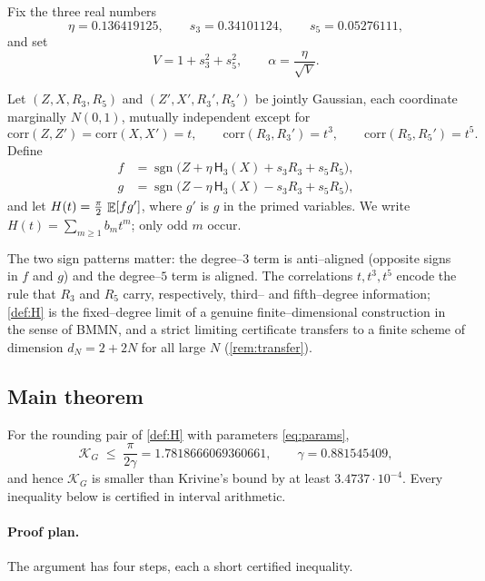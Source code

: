 \documentclass[12pt]{article}
\providecommand{\KG}{\mathcal{K}_G}
\providecommand{\sgn}{\operatorname{sgn}}
\newcommand{\He}{\mathsf{H}}                 %
\newcommand{\gam}{\gamma}
\begin{document}
Fix the three real numbers
\begin{equation}\label{eq:params}
   \eta=0.136419125,\qquad s_3=0.34101124,\qquad s_5=0.05276111,
\end{equation}
and set
\begin{equation}\label{eq:VW}
   V=1+s_3^2+s_5^2,\qquad \alpha=\frac{\eta}{\sqrt V}.
\end{equation}

\begin{definition}\label{def:H}
Let $(Z,X,R_3,R_5)$ and $(Z',X',R_3',R_5')$ be jointly Gaussian, each coordinate
marginally $N(0,1)$, mutually independent except for
\[
   \mathrm{corr}(Z,Z')=\mathrm{corr}(X,X')=t,\qquad
   \mathrm{corr}(R_3,R_3')=t^3,\qquad \mathrm{corr}(R_5,R_5')=t^5 .
\]
Define
\begin{align}
   f &= \sgn\bigl(Z+\eta\,\He_3(X)+s_3R_3+s_5R_5\bigr),\label{eq:f}\\
   g &= \sgn\bigl(Z-\eta\,\He_3(X)-s_3R_3+s_5R_5\bigr),\label{eq:g}
\end{align}
and let $H(t)=\tfrac{\pi}{2}\,\mathop{\mathbb{E}}[fg']$, where $g'$ is $g$ in the primed
variables.  We write $H(t)=\sum_{m\ge1}b_mt^m$; only odd $m$ occur.
\end{definition}

The two sign patterns matter: the degree--$3$ term is anti--aligned (opposite
signs in $f$ and $g$) and the degree--$5$ term is aligned.  The correlations
$t,t^3,t^5$ encode the rule that $R_3$ and $R_5$ carry, respectively, third-- and
fifth--degree information; \cref{def:H} is the fixed--degree limit of a genuine
finite--dimensional construction in the sense of BMMN, and a strict limiting
certificate transfers to a finite scheme of dimension $d_N=2+2N$ for all large
$N$ (\cref{rem:transfer}).

\subsection{Main theorem}

\begin{theorem}\label{thm:main}
For the rounding pair of \cref{def:H} with parameters \eqref{eq:params},
\[
   \KG \;\le\; \frac{\pi}{2\gam}=1.7818666069360661,
   \qquad \gam=0.881545409 ,
\]
and hence $\KG$ is smaller than Krivine's bound by at least
$3.4737\cdot10^{-4}$.  Every inequality below is certified in interval
arithmetic.
\end{theorem}

\paragraph{Proof plan.}
The argument has four steps, each a short certified inequality.
\end{document}
